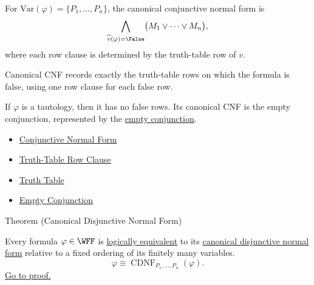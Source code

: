 \begin{remark*}
For \(\mathrm{Var}(\varphi)=\{P_1,\ldots,P_n\}\), the canonical
conjunctive normal form is
\[
\bigwedge_{\widehat v(\varphi)=\False}
\bigl(M_1\lor\cdots\lor M_n\bigr),
\]
where each row clause is determined by the truth-table row of \(v\).
\end{remark*}

\begin{remark*}[Interpretation]
Canonical CNF records exactly the truth-table rows on which the formula is
false, using one row clause for each false row.
\end{remark*}

\begin{remark*}[Examples]
If \(\varphi\) is a tautology, then it has no false rows. Its canonical CNF is
the empty conjunction, represented by the
\hyperref[def:empty-conjunction-propositional-logic]{empty conjunction}.
\end{remark*}

\begin{dependencies}
\begin{itemize}
  \item \hyperref[def:conjunctive-normal-form-propositional-logic]{Conjunctive Normal Form}
  \item \hyperref[def:truth-table-row-clause-propositional-logic]{Truth-Table Row Clause}
  \item \hyperref[def:truth-table-propositional-logic]{Truth Table}
  \item \hyperref[def:empty-conjunction-propositional-logic]{Empty Conjunction}
\end{itemize}
\end{dependencies}

\begin{theorembox}{Theorem (Canonical Disjunctive Normal Form)}
\begin{theorem}
\label{thm:canonical-disjunctive-normal-form-propositional-logic}
Every formula \(\varphi\in\WFF\) is
\hyperref[def:logical-equivalence-propositional-logic]{logically equivalent}
to its
\hyperref[def:canonical-disjunctive-normal-form-propositional-logic]{canonical disjunctive normal form}
relative to a fixed ordering of its finitely many variables.
\[
\varphi\equiv \operatorname{CDNF}_{P_1,\ldots,P_n}(\varphi).
\]
\noindent\hyperref[prf:canonical-disjunctive-normal-form-propositional-logic]{Go to proof.}
\end{theorem}
\end{theorembox}

